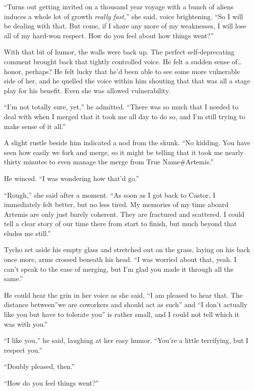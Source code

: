 ``Turns out getting invited on a thousand year voyage with a bunch of aliens induces a whole lot of growth \emph{really fast,}'' she said, voice brightening. ``So I will be dealing with that. But come, if I share any more of my weaknesses, I will lose all of my hard-won respect. How do you feel about how things went?''

With that bit of humor, the walls were back up. The perfect self-deprecating comment brought back that tightly controlled voice. He felt a sudden sense of\ldots honor, perhaps? He felt lucky that he'd been able to see some more vulnerable side of her, and he quelled the voice within him shouting that that was all a stage play for his benefit. Even she was allowed vulnerability.

``I'm not totally sure, yet,'' he admitted. ``There was so much that I needed to deal with when I merged that it took me all day to do so, and I'm still trying to make sense of it all.''

A slight rustle beside him indicated a nod from the skunk. ``No kidding. You have seen how easily we fork and merge, so it might be telling that it took me nearly thirty minutes to even manage the merge from True Name\#Artemis.''

He winced. ``I was wondering how that'd go.''

``Rough,'' she said after a moment. ``As soon as I got back to Castor, I immediately felt better, but no less tired. My memories of my time aboard Artemis are only just barely coherent. They are fractured and scattered. I could tell a clear story of our time there from start to finish, but much beyond that eludes me still.''

Tycho set aside his empty glass and stretched out on the grass, laying on his back once more, arms crossed beneath his head. ``I was worried about that, yeah. I can't speak to the ease of merging, but I'm glad you made it through all the same.''

He could hear the grin in her voice as she said, ``I am pleased to hear that. The distance between''we are coworkers and should act as such'' and ``I don't actually like you but have to tolerate you'' is rather small, and I could not tell which it was with you.''

``I like you,'' he said, laughing at her easy humor. ``You're a little terrifying, but I respect you.''

``Doubly pleased, then.''

``How do you feel things went?''

